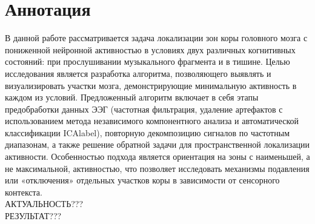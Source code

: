\chapter*{Аннотация}
\label{ch:annotation}
В данной работе рассматривается задача локализации зон коры головного мозга с пониженной нейронной активностью в условиях двух различных когнитивных состояний: при прослушивании музыкального фрагмента и в тишине. Целью исследования является разработка алгоритма, позволяющего выявлять и визуализировать участки мозга, демонстрирующие минимальную активность в каждом из условий. Предложенный алгоритм включает в себя этапы предобработки данных ЭЭГ (частотная фильтрация, удаление артефактов с использованием метода независимого компонентного анализа и автоматической классификации ICAlabel), повторную декомпозицию сигналов по частотным диапазонам, а также решение обратной задачи для пространственной локализации активности.
Особенностью подхода является ориентация на зоны с наименьшей, а не максимальной, активностью, что позволяет исследовать механизмы подавления или «отключения» отдельных участков коры в зависимости от сенсорного контекста.\\
АКТУАЛЬНОСТЬ???\\
РЕЗУЛЬТАТ???
\vspace*{-\baselineskip}
